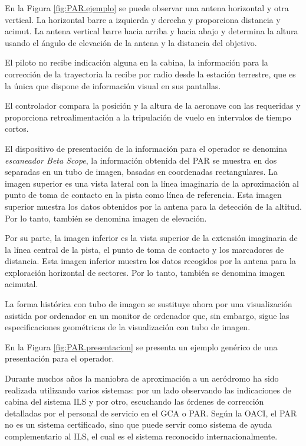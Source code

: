 En la Figura \ref{fig:PAR.ejemplo} se puede observar una antena horizontal y otra vertical. La horizontal barre a izquierda y derecha y proporciona distancia y acimut. La antena vertical barre hacia arriba y hacia abajo y determina la altura usando el ángulo de elevación de la antena y la distancia del objetivo.

El piloto no recibe indicación alguna en la cabina, la información para la corrección de la trayectoria la recibe por radio desde la estación terrestre, que es la única que dispone de información visual en sus pantallas.

El controlador compara la posición y la altura de la aeronave con las requeridas y proporciona retroalimentación a la tripulación de vuelo en intervalos de tiempo cortos.

El dispositivo de presentación de la información para el operador se denomina \emph{escaneador Beta Scope},  la información obtenida del PAR se muestra en dos separadas en un tubo de imagen, basadas en coordenadas rectangulares. La imagen superior es una vista lateral con la línea imaginaria de la aproximación al punto de toma de contacto en la pista como línea de referencia. Esta imagen superior muestra los datos obtenidos por la antena para la detección de la altitud. Por lo tanto, también se denomina imagen de elevación.

Por su parte, la imagen inferior es la vista superior de la extensión imaginaria de la línea central de la pista, el punto de toma de contacto y los marcadores de distancia. Esta imagen inferior muestra los datos recogidos por la antena para la exploración horizontal de sectores. Por lo tanto, también se denomina imagen acimutal.

La forma histórica con tubo de imagen se sustituye ahora por una visualización asistida por ordenador en un monitor de ordenador que, sin embargo, sigue las especificaciones geométricas de la visualización con tubo de imagen.

En la Figura \ref{fig:PAR.presentacion} se presenta un ejemplo genérico de una presentación para el operador.


Durante muchos años la maniobra de aproximación a un aeródromo ha sido realizada utilizando varios sistemas: por un lado observando las indicaciones de cabina del sistema ILS y por otro, escuchando las órdenes de corrección detalladas por el personal de servicio en el GCA o PAR. Según la OACI, el PAR no es un sistema certificado, sino que puede servir como sistema de ayuda complementario al ILS, el cual es el sistema reconocido internacionalmente.

